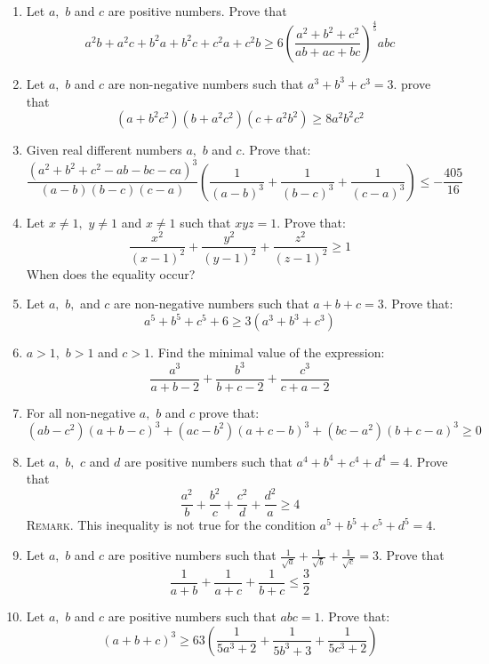 \documentclass{article}
\begin{document}
\begin{enumerate}
\item  Let $ a,$ $ b$ and $ c$ are positive numbers. Prove that
\[ a^2b + a^2c + b^2a + b^2c + c^2a + c^2b\geq6\left(\frac  {a^2 + b^2 + c^2}{ab + ac + bc}\right)^{\frac  {4}{5}}abc
\]

\item  Let $ a,$ $ b$ and $ c$ are non-negative numbers such that $ a^3+b^3+c^3=3.$ prove that
\[ (a+b^2c^2)(b+a^2c^2)(c+a^2b^2)\geq8a^2b^2c^2\]

\item  Given real different numbers $ a,$ $ b$ and $ c$. Prove that:
\[ \frac  {(a^2 + b^2 + c^2 - ab - bc - ca)^3}{(a - b)(b - c)(c - a)}\left(\frac  {1}{(a - b)^3} + \frac  {1}{(b - c)^3} + \frac  {1}{(c - a)^3}\right) \leq - \frac  {405}{16}
\]

\item  Let $ x\neq1,$ $ y\neq1$ and $ x\neq1$ such that $ xyz=1.$ Prove that:
\[ \frac {{x^2 }}{{\left( {x - 1} \right)^2 }} + \frac {{y^2 }}{{\left( {y - 1} \right)^2 }} + \frac {{z^2 }}{{\left( {z - 1} \right)^2 }} \ge 1\]
When does the equality occur?

\item  Let $ a,$ $ b,$ and $ c$ are non-negative numbers such that $ a+b+c=3.$ Prove that:
\[ a^5+b^5+c^5+6\geq3(a^3+b^3+c^3)\]

\item  $ a > 1,$ $ b > 1$ and $ c > 1.$ Find the minimal value of the expression:
\[ \frac  {a^3}{a + b - 2} + \frac  {b^3}{b + c - 2} + \frac  {c^3}{c + a - 2}
\]
\item  For all non-negative $ a,$ $ b$ and $ c$ prove that:
\[ (ab-c^2)(a+b-c)^3+(ac-b^2)(a+c-b)^3+(bc-a^2)(b+c-a)^3\geq0\]
\item  Let $ a,$ $ b,$ $ c$ and $ d$ are positive numbers such that $ a^4+b^4+c^4+d^4=4.$ Prove that
\[ \frac  {a^2}{b} + \frac  {b^2}{c} + \frac  {c^2}{d} + \frac  {d^2}{a}\geq4
\]
\textsc{Remark.} This inequality is not true for the condition $ a^5+b^5+c^5+d^5=4.$

\item  Let $ a,$ $ b$ and $ c$ are positive numbers such that $ \displaystyle\frac {1}{\sqrt a}+\frac {1}{\sqrt b}+\frac {1}{\sqrt c}=3.$ Prove that
\[ \frac {1}{a+b}+\frac {1}{a+c}+\frac {1}{b+c}\leq\frac {3}{2}\]

\item  Let $ a,$ $ b$ and $ c$ are positive numbers such that $ abc=1.$ Prove that:
\[ (a+b+c)^3\geq63\left(\frac  {1}{5a^3 + 2} + \frac  {1}{5b^3 + 3} + \frac  {1}{5c^3 + 2}\right) \]


\end{enumerate}
\end{document}
